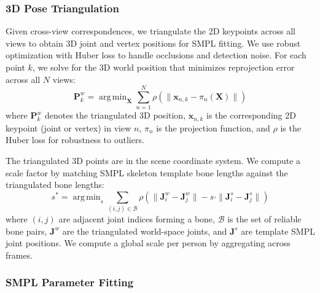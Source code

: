 \documentclass[acmtog]{acmart}
\DeclareMathOperator*{\argmin}{arg\,min}
\begin{document}
\subsubsection{3D Pose Triangulation}
\label{sec:triangulation}

Given cross-view correspondences, we triangulate the 2D keypoints across all views to obtain 3D joint and vertex positions for SMPL fitting.
We use robust optimization with Huber loss to handle occlusions and detection noise.
For each point $k$, we solve for the 3D world position that minimizes reprojection error across all $N$ views:
\begin{equation}
\mathbf{P}^{w}_k = \argmin_{\mathbf{X}} \sum_{n=1}^{N} \rho\left(\|\mathbf{x}_{n,k} - \pi_n(\mathbf{X})\|\right)
\end{equation}
where $\mathbf{P}^{w}_k$ denotes the triangulated 3D position, $\mathbf{x}_{n,k}$ is the corresponding 2D keypoint (joint or vertex) in view $n$, $\pi_n$ is the projection function, and $\rho$ is the Huber loss for robustness to outliers.

The triangulated 3D points are in the scene coordinate system. We compute a scale factor by matching SMPL skeleton template bone lengths against the triangulated bone lengths:
\begin{equation}
s^* = \argmin_s \sum_{(i,j) \in \mathcal{B}} \rho\left(\|\mathbf{J}^{w}_i - \mathbf{J}^{w}_j\| - s \cdot \|\mathbf{J}^{s}_i - \mathbf{J}^{s}_j\|\right)
\end{equation}
where $(i,j)$ are adjacent joint indices forming a bone, $\mathcal{B}$ is the set of reliable bone pairs, $\mathbf{J}^{w}$ are the triangulated world-space joints, and $\mathbf{J}^{s}$ are template SMPL joint positions.
We compute a global scale per person by aggregating across frames.

\subsubsection{SMPL Parameter Fitting}
\end{document}
